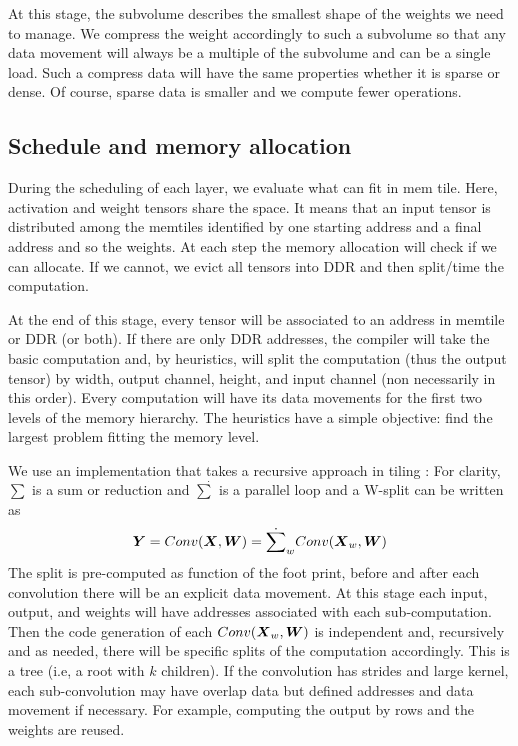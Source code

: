 \documentclass[sigconf]{acmart}
\begin{document}
At this stage, the subvolume describes the smallest shape of the
weights we need to manage. We compress the weight accordingly to such
a subvolume so that any data movement will always be a multiple of the
subvolume and can be a single load. Such a compress data will have the
same properties whether it is sparse or dense. Of course, sparse data is
smaller and we compute fewer operations.


\subsection{Schedule and memory allocation}
During the scheduling of each layer, we evaluate what can fit in mem
tile. Here, activation and weight tensors share the space. It means
that an input tensor is distributed among the memtiles identified by
one starting address and a final address and so the weights. At each
step the memory allocation will check if we can allocate. If we
cannot, we evict all tensors into DDR and then split/time the
computation.

At the end of this stage, every tensor will be associated to an
address in memtile or DDR (or both). If there are only DDR addresses,
the compiler will take the basic computation and, by heuristics, will
split the computation (thus the output tensor) by width, output
channel, height, and input channel (non necessarily in this
order). Every computation will have its data movements for the first
two levels of the memory hierarchy. The heuristics have a simple
objective: find the largest problem fitting the memory level.

We use an implementation that takes a recursive approach in tiling
\cite{abs-2110-04327}: For clarity, $\sum$ is a sum or reduction and
$\dot{\sum}$ is a parallel loop and a W-split can be written as
\begin{equation}
  {\boldsymbol Y} =  Conv({\boldsymbol X},{\boldsymbol W}) = \dot{\sum}_w
  Conv({\boldsymbol X}_w,{\boldsymbol W})
\end{equation}
The split is pre-computed as function of the foot print, before and
after each convolution there will be an explicit data movement. At
this stage each input, output, and weights will have addresses
associated with each sub-computation. Then the code generation of each
$Conv({\boldsymbol X}_w,{\boldsymbol W})$ is independent and, recursively and as needed,
there will be specific splits of the computation accordingly. This is
a tree (i.e, a root with $k$ children). If the convolution has strides
and large kernel, each sub-convolution may have overlap data but
defined addresses and data movement if necessary. For example,
computing the output by rows and the weights are reused.
\end{document}
